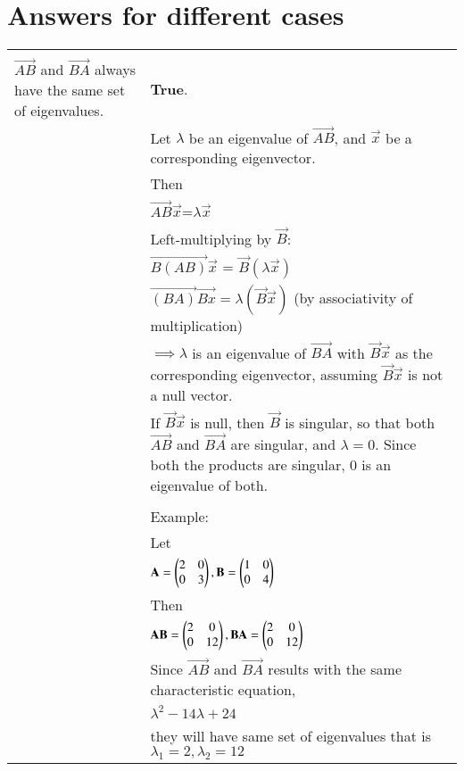 \documentclass[journal,12pt,twocolumn]{IEEEtran}
\newcommand\myemptypage{
	\null
	\thispagestyle{empty}
	\addtocounter{page}{-1}
	\newpage
}
\begin{document}
\section{Answers for different cases}
\pagebreak
\myemptypage
\begin{table}[h]
	\begin{tabular}{|m{3cm}|m{14cm}|}
		\hline
		&\\
		$\vec{AB}$ and $\vec{BA}$ always have the same set of eigenvalues.
		& \textbf{True}. \\
		& Let  $\lambda$  be an eigenvalue of  $\vec{AB}$, and $\vec{x}$  be a corresponding eigenvector.\\
		&Then \\
		& \qquad\qquad\qquad$\vec{AB} \vec{x}$=$\lambda \vec{x}$ \\
		& Left-multiplying by $\vec{B}$:\\
		&\qquad\qquad\qquad$\vec{B(AB)}\vec{x}$ = $\vec{B}(\lambda \vec{x})$\\
		& \qquad\qquad\qquad$\vec{(BA)}\vec{Bx}=\lambda(\vec{B}\vec{x})$  (by associativity of multiplication)\\
	    & $\implies  \lambda $ is an eigenvalue of  $\vec{BA}$  with  $\vec{B}\vec{x}$  as the corresponding eigenvector, assuming  $\vec{B}\vec{x}$  is not a null vector.\\
		&If  $\vec{B}\vec{x}$   is null, then  $\vec{B}$   is singular, so that both  $\vec{AB}$ and  $\vec{BA}$ are singular, and  $\lambda=0$. Since both the products are singular,  0  is an eigenvalue of both.\\
		&\\
		& Example:\\
		& Let \\
		&\qquad\qquad\qquad$\mathbf{A} = \begin{pmatrix}2 & 0 \\ 0 & 3\end{pmatrix}, \mathbf{B} = \begin{pmatrix}1 & 0 \\ 0 & 4\end{pmatrix}$\\
		&Then\\
		& \qquad\qquad\qquad$\mathbf{AB} = \begin{pmatrix}2 & 0 \\ 0 & 12\end{pmatrix}, \mathbf{BA} = \begin{pmatrix}2 & 0 \\ 0 & 12\end{pmatrix}$\\
		& Since $\vec{AB}$ and $\vec{BA}$ results with the same characteristic equation,\\
		& \qquad\qquad\qquad $\lambda^2 - 14\lambda + 24$\\
		&they will have same set of eigenvalues that is $\lambda_1 = 2, \lambda_2 = 12$\\

\end{tabular}
\end{table}
\end{document}
